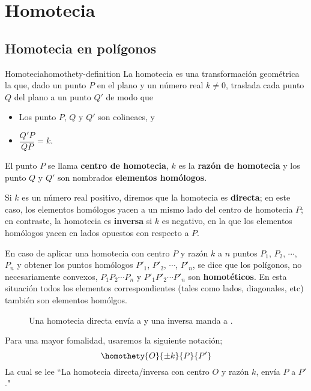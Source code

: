\newpage
\section{Homotecia}



\subsection{Homotecia en polígonos}

\begin{section-definition.tcb}{Homotecia}{homothety-definition}
    La homotecia es una transformación geométrica la que, dado un punto $P$ en el plano y un número real $k \neq 0$, traslada cada punto $Q$ del plano a un punto $Q'$ de modo que
    \begin{itemize}
        \item Los punto $P$, $Q$ y $Q'$ son colineaes, y
        \item $\dfrac{Q' P}{QP} = k$.
    \end{itemize}
\end{section-definition.tcb}

El punto $P$ se llama \textbf{centro de homotecia}, $k$ es la \textbf{razón de homotecia} y los punto $Q$ y $Q'$ son nombrados \textbf{elementos homólogos}.

Si $k$ es un número real positivo, diremos que la homotecia es \textbf{directa}; en este caso, los elementos homólogos yacen a un mismo lado del centro de homotecia $P$; en contraste, la homotecia es \textbf{inversa} si $k$ es negativo, en la que los elementos homólogos yacen en lados opuestos con respecto a $P$.

En caso de aplicar una homotecia con centro $P$ y razón $k$ a $n$ puntos $P_1$, $P_2$, $\cdots$, $P_n$ y obtener los puntos homólogos $P'_1$, $P'_2$, $\cdots$, $P'_n$, se dice que los polígonos, no necesariamente convexos, $P_1 P_2 \cdots P_n$ y $P'_1 P'_2 \cdots P'_n$ son \textbf{homotéticos}.
En esta situación todos los elementos correspondientes (tales como lados, diagonales, etc) también son elementos homólgos.

\begin{figure}[H]
    \centering
    
    \caption{Una homotecia directa envía  a  y una inversa manda  a .}
    \label{fig:homothety-definition}
\end{figure}

\begin{remark.tcb}
    Para una mayor fomalidad, usaremos la siguiente notación;
    \[
        \homothety{O}{\pm k}{P}{P'}
    \]
    La cual se lee ``La homotecia directa/inversa con centro $O$ y razón $k$, envía $P$ a $P'$."
\end{remark.tcb}

